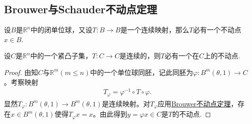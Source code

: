 \documentclass[../../main.tex]{subfiles}%
\begin{document}
\subsection{Brouwer与Schauder不动点定理}

\begin{theorem}[Brouwer不动点定理]\label{theorem:泛函分析---Brouwer不动点定理}
设$B$是$\mathbb{R}^n$中的闭单位球，又设$T: B \to B$是一个连续映射，那么$T$必有一个不动点$x \in B$.
\end{theorem}

\begin{corollary}\label{corollary:泛函分析--推论1.5.14}
设$C$是$\mathbb{R}^n$中的一个紧凸子集，$T: C \to C$是连续的，则$T$必有一个在$C$上的不动点.
\end{corollary}
\begin{proof}

由知$C$与$\mathbb{R}^m(m \leqslant n)$中的一个单位球同胚，记此同胚为$\varphi: B^m(\theta, 1) \to C$。考察映射
\begin{align*}
T_\varphi = \varphi^{-1} \circ T \circ \varphi.
\end{align*}
显然$T_\varphi: B^m(\theta, 1) \to B^m(\theta, 1)$是连续映射。对$T_\varphi$应用\hyperref[theorem:泛函分析---Brouwer不动点定理]{Brouwer不动点定理}，存在$x \in B^m(\theta, 1)$使得$T_\varphi x = x$。由此得到$y = \varphi x \in C$是$T$的不动点.

\end{proof}
\end{document}
